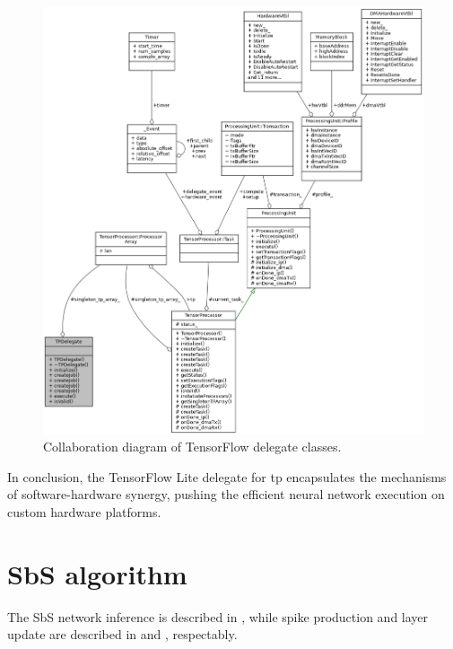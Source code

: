 \begin{figure}[h!]
	\centering
	\includegraphics[width=\textwidth]{./figures/class_t_p_delegate__coll__graph.png}
	\caption{Collaboration diagram of TensorFlow delegate classes.}
	\label{fig:sw_tp_delegate}
\end{figure}


In conclusion, the TensorFlow Lite delegate for \gls{tp} encapsulates the mechanisms of software-hardware synergy, pushing the efficient neural network execution on custom hardware platforms.

\section{SbS algorithm}
\label{chap:appendix}
The SbS network inference is described in , while spike production and layer update are described in  and , respectably.

